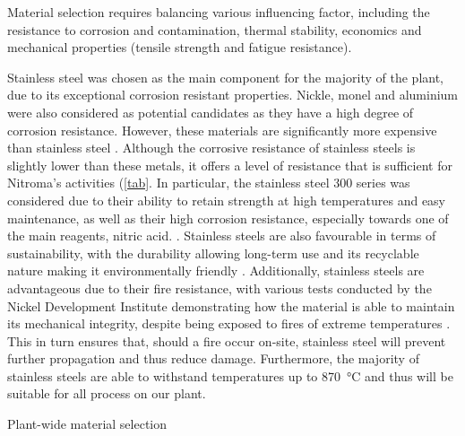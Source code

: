 Material selection requires balancing various influencing factor, including the resistance to corrosion and contamination, thermal stability, economics and mechanical properties (tensile strength and fatigue resistance). 

Stainless steel was chosen as the main component for the majority of the plant, due to its exceptional corrosion resistant properties. Nickle, monel and aluminium were also considered as potential candidates as they have a high degree of corrosion resistance. However, these materials are significantly more expensive than stainless steel \cite{sinnott_coulson_2005}. Although the corrosive resistance of stainless steels is slightly lower than these metals, it offers a level of resistance that is sufficient for Nitroma's activities (\ref{tab}. In particular, the stainless steel 300 series was considered due to their ability to retain strength at high temperatures and easy maintenance, as well as their high corrosion resistance, especially towards one of the main reagents, nitric acid. \cite{national_electronic_alloys_300_2021}. Stainless steels are also favourable in terms of sustainability, with the durability allowing long-term use and its recyclable nature making it environmentally friendly \cite{osterman_stainless_2013}. Additionally, stainless steels are advantageous due to their fire resistance, with various tests conducted by the Nickel Development Institute demonstrating how the material is able to maintain its mechanical integrity, despite being exposed to fires of extreme temperatures \cite{waller_stainless_1990}. This in turn ensures that, should a fire occur on-site, stainless steel will prevent further propagation and thus reduce damage.  Furthermore, the majority of stainless steels are able to withstand temperatures up to \SI{870}{\celsius} and thus will be suitable for all process on our plant. 

\begin{table}[hp]
    \centering
    \caption{Plant-wide material selection}
    \label{tab:material}
    
    
    
\end{table}
